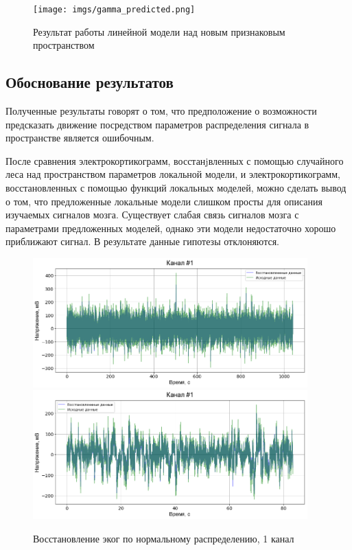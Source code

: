 \documentclass{mipt-thesis-bs}
\begin{document}
\begin{figure}[h]
\begin{center}
	\texttt{[image: imgs/gamma\_predicted.png]}
	
	\caption{Результат работы линейной модели над новым признаковым пространством}	
	\label{fig:gamma}
\end{center}
\end{figure}

\subsection{Обоснование результатов}

Полученные результаты говорят о том, что предположение о возможности предсказать движение посредством параметров распределения сигнала в пространстве является ошибочным.

После сравнения электрокортикограмм, восстанjвленных с помощью случайного леса над пространством параметров локальной модели, и электрокортикограмм, восстановленных с помощью функций локальных моделей, можно сделать вывод о том, что предложенные локальные модели слишком просты для описания изучаемых сигналов мозга. Существует слабая связь сигналов мозга с параметрами предложенных моделей, однако эти модели недостаточно хорошо приближают сигнал.  В результате данные гипотезы отклоняются.

\begin{figure}
\begin{center}
	\includegraphics[width=300pt,height=\textheight,keepaspectratio]{imgs/Gauss_ch1.png}
	\includegraphics[width=300pt,height=\textheight,keepaspectratio]{imgs/Gauss_ch1_80s.png}
	\caption{Восстановление эког по нормальному распределению, 1 канал}	
	\label{fig:gauss ecog}
	\end{center}
\end{figure}
\end{document}
